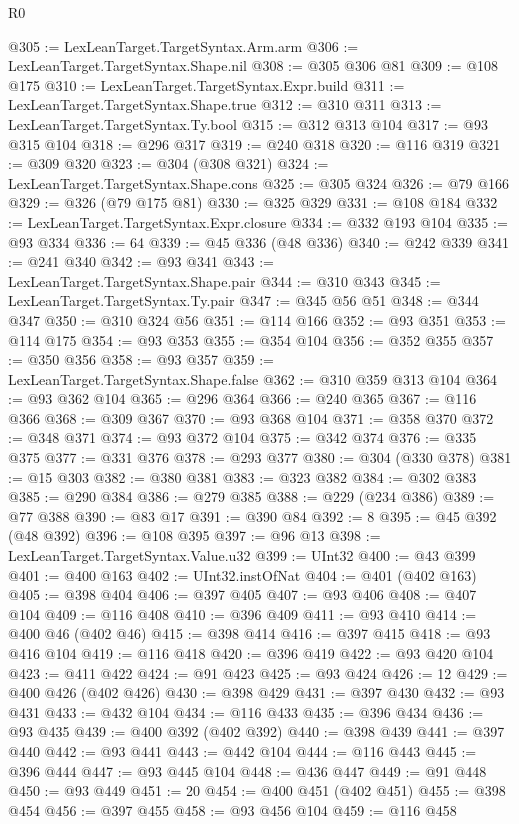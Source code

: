 \begin{lexlean}{R0}
\begin{coremodule}
@305 := LexLeanTarget.TargetSyntax.Arm.arm
@306 := LexLeanTarget.TargetSyntax.Shape.nil
@308 := @305 @306 @81
@309 := @108 @175
@310 := LexLeanTarget.TargetSyntax.Expr.build
@311 := LexLeanTarget.TargetSyntax.Shape.true
@312 := @310 @311
@313 := LexLeanTarget.TargetSyntax.Ty.bool
@315 := @312 @313 @104
@317 := @93 @315 @104
@318 := @296 @317
@319 := @240 @318
@320 := @116 @319
@321 := @309 @320
@323 := @304 (@308 @321)
@324 := LexLeanTarget.TargetSyntax.Shape.cons
@325 := @305 @324
@326 := @79 @166
@329 := @326 (@79 @175 @81)
@330 := @325 @329
@331 := @108 @184
@332 := LexLeanTarget.TargetSyntax.Expr.closure
@334 := @332 @193 @104
@335 := @93 @334
@336 := 64
@339 := @45 @336 (@48 @336)
@340 := @242 @339
@341 := @241 @340
@342 := @93 @341
@343 := LexLeanTarget.TargetSyntax.Shape.pair
@344 := @310 @343
@345 := LexLeanTarget.TargetSyntax.Ty.pair
@347 := @345 @56 @51
@348 := @344 @347
@350 := @310 @324 @56
@351 := @114 @166
@352 := @93 @351
@353 := @114 @175
@354 := @93 @353
@355 := @354 @104
@356 := @352 @355
@357 := @350 @356
@358 := @93 @357
@359 := LexLeanTarget.TargetSyntax.Shape.false
@362 := @310 @359 @313 @104
@364 := @93 @362 @104
@365 := @296 @364
@366 := @240 @365
@367 := @116 @366
@368 := @309 @367
@370 := @93 @368 @104
@371 := @358 @370
@372 := @348 @371
@374 := @93 @372 @104
@375 := @342 @374
@376 := @335 @375
@377 := @331 @376
@378 := @293 @377
@380 := @304 (@330 @378)
@381 := @15 @303
@382 := @380 @381
@383 := @323 @382
@384 := @302 @383
@385 := @290 @384
@386 := @279 @385
@388 := @229 (@234 @386)
@389 := @77 @388
@390 := @83 @17
@391 := @390 @84
@392 := 8
@395 := @45 @392 (@48 @392)
@396 := @108 @395
@397 := @96 @13
@398 := LexLeanTarget.TargetSyntax.Value.u32
@399 := UInt32
@400 := @43 @399
@401 := @400 @163
@402 := UInt32.instOfNat
@404 := @401 (@402 @163)
@405 := @398 @404
@406 := @397 @405
@407 := @93 @406
@408 := @407 @104
@409 := @116 @408
@410 := @396 @409
@411 := @93 @410
@414 := @400 @46 (@402 @46)
@415 := @398 @414
@416 := @397 @415
@418 := @93 @416 @104
@419 := @116 @418
@420 := @396 @419
@422 := @93 @420 @104
@423 := @411 @422
@424 := @91 @423
@425 := @93 @424
@426 := 12
@429 := @400 @426 (@402 @426)
@430 := @398 @429
@431 := @397 @430
@432 := @93 @431
@433 := @432 @104
@434 := @116 @433
@435 := @396 @434
@436 := @93 @435
@439 := @400 @392 (@402 @392)
@440 := @398 @439
@441 := @397 @440
@442 := @93 @441
@443 := @442 @104
@444 := @116 @443
@445 := @396 @444
@447 := @93 @445 @104
@448 := @436 @447
@449 := @91 @448
@450 := @93 @449
@451 := 20
@454 := @400 @451 (@402 @451)
@455 := @398 @454
@456 := @397 @455
@458 := @93 @456 @104
@459 := @116 @458

\end{coremodule}
\end{lexlean}
